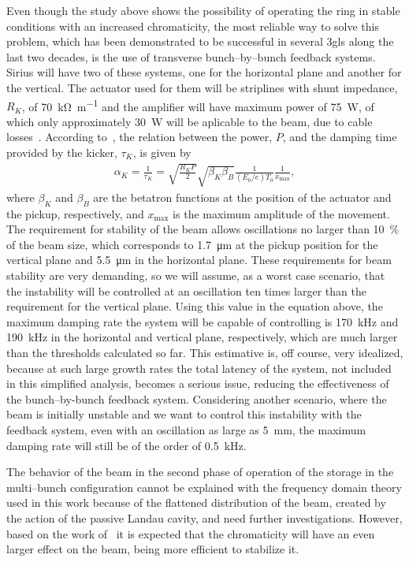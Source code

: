    Even though the study above shows the possibility of operating the ring in stable conditions with an increased chromaticity, the most reliable way to solve this problem, which has been demonstrated to be successful in several \gls{3gls} along the last two decades, is the use of transverse bunch--by--bunch feedback systems. Sirius will have two of these systems, one for the horizontal plane and another for the vertical. The actuator used for them will be striplines with shunt impedance, $R_K$, of \SI{70}{\kilo\ohm\per\meter} and the amplifier will have maximum power of \SI{75}{\watt}, of which only approximately \SI{30}{\watt} will be aplicable to the beam, due to cable losses~\cite{Duarte2018}. According to~, the relation between the power, $P$, and the damping time provided by the kicker, $\tau_K$, is given by
    \begin{align}
        \alpha_K = \frac{1}{\tau_K} =
        \sqrt{\frac{R_KP}{2}}\sqrt{\beta_K\beta_B}\frac{1}{(E_0/e)T_0}\frac{1}{x_\text{max}},
    \end{align}
    where $\beta_K$ and $\beta_B$ are the betatron functions at the position of the actuator and the pickup, respectively, and $x_\text{max}$ is the maximum amplitude of the movement. The requirement for stability of the beam allows oscillations no larger than \SI{10}{\percent} of the beam size, which corresponds to \SI{1.7}{\micro\meter} at the pickup position for the vertical plane and \SI{5.5}{\micro\meter} in the horizontal plane. These requirements for beam stability are very demanding, so we will assume, as a worst case scenario, that the instability will be controlled at an oscillation ten times larger than the requirement for the vertical plane. Using this value in the equation above, the maximum damping rate the system will be capable of controlling is \SI{170}{\kilo\hertz} and \SI{190}{\kilo\hertz} in the horizontal and vertical plane, respectively, which are much larger than the thresholds calculated so far. This estimative is, off course, very idealized, because at such large growth rates the total latency of the system, not included in this simplified analysis, becomes a serious issue, reducing the effectiveness of the bunch--by-bunch feedback system.
    Considering another scenario, where the beam is initially unstable and we want to control this instability with the feedback system, even with an oscillation as large as \SI{5}{\milli\meter}, the maximum damping rate will still be of the order of \SI{0.5}{\kilo\hertz}.

    The behavior of the beam in the second phase of operation of the storage in the multi--bunch configuration cannot be explained with the frequency domain theory used in this work because of the flattened distribution of the beam, created by the action of the passive Landau cavity, and need further investigations. However, based on the work of~ it is expected that the chromaticity will have an even larger effect on the beam, being more efficient to stabilize it.

